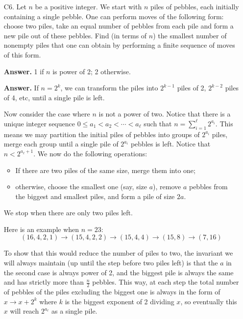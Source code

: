 \documentclass[11pt,a4paper]{article}
\begin{document}
\begin{enumerate}
        \item [C6.]
        Let $n$ be a positive integer. We start with $n$ piles of pebbles, each initially containing a single pebble. One can perform moves of the following form: choose two piles, take an equal number of pebbles from each pile and form a new pile out of these pebbles. Find (in terms of $n$) the smallest number of nonempty piles that one can obtain by performing a finite sequence of moves of this form.
        
        \textbf{Answer.} 1 if $n$ is power of 2; 2 otherwise. 
        
        \textbf{Answer.} If $n=2^k$, we can transform the piles into $2^{k-1}$ piles of 2, 
        $2^{k-2}$ piles of 4, etc, until a single pile is left. 
        
        Now consider the case where $n$ is not a power of two. Notice that there is a unique integer sequence 
        $0\le a_1 < a_2 < \cdots < a_{\ell}$ such that $n = \sum_{i=1}^{\ell} 2^{a_{i}}$. 
        This means we may partition the initial piles of pebbles into groups of $2^{a_i}$ piles, 
        merge each group until a single pile of $2^{a_i}$ pebbles is left. 
        Notice that $n < 2^{a_{\ell} + 1}$. We now do the following operations: 
        \begin{itemize}
        	\item If there are two piles of the same size, merge them into one; 
        	
        	\item otherwise, choose the smallest one (say, size $a$), remove $a$ pebbles from the biggest and smallest piles, 
        	and form a pile of size $2a$. 
        \end{itemize}
        We stop when there are only two piles left. 
        
        Here is an example when $n = 23$: 
        \[
        (16, 4, 2, 1) \to (15, 4, 2, 2) \to (15, 4, 4)\to (15, 8)\to (7, 16)
        \]
        
        To show that this would reduce the number of piles to two, the invariant we will always maintain (up until the step before two piles left) is that the $a$ in the second case is always power of 2, 
        and the biggest pile is always the same and has strictly more than $\frac{n}{2}$ pebbles. 
        This way, at each step the total number of pebbles of the piles excluding the biggest one is always in the form of $x\to x+2^k$ where $k$ is the biggest exponent of 2 dividing $x$, 
        so eventually this $x$ will reach $2^{a_{\ell}}$ as a single pile. 
        

\end{enumerate}
\end{document}
